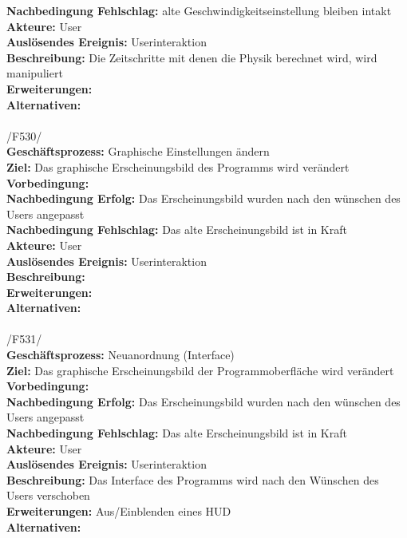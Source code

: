 \textbf{Nachbedingung Fehlschlag:} alte Geschwindigkeitseinstellung bleiben intakt\\
\textbf{Akteure:} User\\
\textbf{Auslösendes Ereignis:} Userinteraktion\\
\textbf{Beschreibung:} Die Zeitschritte mit denen die Physik berechnet wird, wird manipuliert\\
\textbf{Erweiterungen:}\\
\textbf{Alternativen:}\\
\\
/F530/\\
\textbf{Geschäftsprozess:}  Graphische Einstellungen ändern\\
\textbf{Ziel:}  Das graphische Erscheinungsbild des Programms wird verändert\\
\textbf{Vorbedingung:} \\
\textbf{Nachbedingung Erfolg:} Das Erscheinungsbild wurden nach den wünschen des Users angepasst\\
\textbf{Nachbedingung Fehlschlag:} Das alte Erscheinungsbild ist in Kraft\\
\textbf{Akteure:} User\\
\textbf{Auslösendes Ereignis:} Userinteraktion\\
\textbf{Beschreibung:} \\
\textbf{Erweiterungen:}\\
\textbf{Alternativen:}\\
\\
/F531/\\
\textbf{Geschäftsprozess:}  Neuanordnung (Interface)\\
\textbf{Ziel:}  Das graphische Erscheinungsbild der Programmoberfläche wird verändert\\
\textbf{Vorbedingung:} \\
\textbf{Nachbedingung Erfolg:} Das Erscheinungsbild wurden nach den wünschen des Users angepasst\\
\textbf{Nachbedingung Fehlschlag:} Das alte Erscheinungsbild ist in Kraft\\
\textbf{Akteure:} User\\
\textbf{Auslösendes Ereignis:} Userinteraktion\\
\textbf{Beschreibung:} Das Interface des Programms wird nach den Wünschen des Users verschoben\\
\textbf{Erweiterungen:} Aus/Einblenden eines HUD\\
\textbf{Alternativen:}\\
